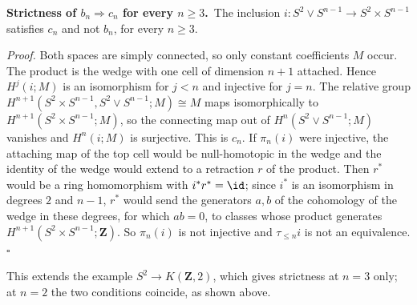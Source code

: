 \textbf{Strictness of $b_n\Rightarrow c_n$ for every $n\geq3$.}\ours\ The inclusion $i:S^2\vee S^{n-1}\to S^2\times S^{n-1}$ satisfies $c_n$ and not $b_n$, for every $n\geq3$.

\textit{Proof.} Both spaces are simply connected, so only constant coefficients $M$ occur. The product is the wedge with one cell of dimension $n+1$ attached. Hence $H^j(i;M)$ is an isomorphism for $j<n$ and injective for $j=n$. The relative group $H^{n+1}(S^2\times S^{n-1},S^2\vee S^{n-1};M)\cong M$ maps isomorphically to $H^{n+1}(S^2\times S^{n-1};M)$, so the connecting map out of $H^n(S^2\vee S^{n-1};M)$ vanishes and $H^n(i;M)$ is surjective. This is $c_n$. If $\pi_n(i)$ were injective, the attaching map of the top cell would be null-homotopic in the wedge and the identity of the wedge would extend to a retraction $r$ of the product. Then $r^*$ would be a ring homomorphism with $i^*r^*=\id$; since $i^*$ is an isomorphism in degrees $2$ and $n-1$, $r^*$ would send the generators $a,b$ of the cohomology of the wedge in these degrees, for which $ab=0$, to classes whose product generates $H^{n+1}(S^2\times S^{n-1};\mathbf Z)$. So $\pi_n(i)$ is not injective and $\tau_{\leq n}i$ is not an equivalence.\hfill$\square$

This extends the example $S^2\to K(\mathbf Z,2)$, which gives strictness at $n=3$ only; at $n=2$ the two conditions coincide, as shown above.
